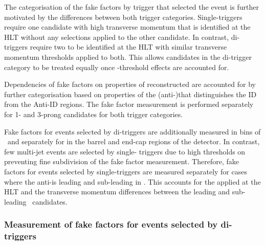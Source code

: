 The categorisation of the fake factors by trigger that selected the
event is further motivated by the differences between both trigger
categories. Single-\tauhadvis triggers require one \tauhadvis
candidate with high transverse momentum that is identified at the HLT
without any selections applied to the other candidate. In contrast,
di-\tauhadvis triggers require two \tauhadvis to be identified at the
HLT with similar transverse momentum thresholds applied to both. This
allows \tauhadvis candidates in the di-\tauhadvis trigger category to
be treated equally once \pT-threshold effects are accounted
for. %

Dependencies of fake factors on properties of reconstructed \tauhadvis
are accounted for by further categorisation based on properties of the
(anti-)\tauhadvis that distinguishes the ID from the Anti-ID
regions. The fake factor measurement is performed separately for 1-
and 3-prong \tauhadvis candidates for both trigger categories.

Fake factors for events selected by di-\tauhadvis triggers are
additionally measured in bins of \tauhadvis~\pT and separately for
\tauhadvis in the barrel and end-cap regions of the detector. In
contrast, few multi-jet events are selected by single-\tauhadvis
triggers due to high \pT thresholds on \tauhadvis preventing fine
subdivision of the fake factor measurement. Therefore, fake factors
for events selected by single-\tauhadvis triggers are measured
separately for cases where the anti-\tauhadvis is leading and
sub-leading in \pT. This accounts for the \tauid applied at the HLT
and the transverse momentum differences between the leading and
sub-leading \tauhadvis~candidates.


\subsubsection{Measurement of fake factors for events selected by
  di-\tauhadvis triggers}

